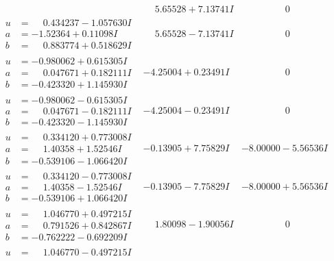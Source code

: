 \documentclass[1p]{elsarticle_modified}
\theoremstyle{definition}
\begin{document}
$$\begin{array}{c|c|c}
 & \phantom{-}5.65528 + 7.13741 I & \phantom{-0.000000 } 0 \\ \hline\begin{aligned}
u &= \phantom{-}0.434237 - 1.057630 I \\
a &= -1.52364 + 0.11098 I \\
b &= \phantom{-}0.883774 + 0.518629 I\end{aligned}
 & \phantom{-}5.65528 - 7.13741 I & \phantom{-0.000000 } 0 \\ \hline\begin{aligned}
u &= -0.980062 + 0.615305 I \\
a &= \phantom{-}0.047671 + 0.182111 I \\
b &= -0.423320 + 1.145930 I\end{aligned}
 & -4.25004 + 0.23491 I & \phantom{-0.000000 } 0 \\ \hline\begin{aligned}
u &= -0.980062 - 0.615305 I \\
a &= \phantom{-}0.047671 - 0.182111 I \\
b &= -0.423320 - 1.145930 I\end{aligned}
 & -4.25004 - 0.23491 I & \phantom{-0.000000 } 0 \\ \hline\begin{aligned}
u &= \phantom{-}0.334120 + 0.773008 I \\
a &= \phantom{-}1.40358 + 1.52546 I \\
b &= -0.539106 - 1.066420 I\end{aligned}
 & -0.13905 + 7.75829 I & -8.00000 - 5.56536 I \\ \hline\begin{aligned}
u &= \phantom{-}0.334120 - 0.773008 I \\
a &= \phantom{-}1.40358 - 1.52546 I \\
b &= -0.539106 + 1.066420 I\end{aligned}
 & -0.13905 - 7.75829 I & -8.00000 + 5.56536 I \\ \hline\begin{aligned}
u &= \phantom{-}1.046770 + 0.497215 I \\
a &= \phantom{-}0.791526 + 0.842867 I \\
b &= -0.762222 - 0.692209 I\end{aligned}
 & \phantom{-}1.80098 - 1.90056 I & \phantom{-0.000000 } 0 \\ \hline\begin{aligned}
u &= \phantom{-}1.046770 - 0.497215 I \\

\end{aligned}
\end{array}$$
\end{document}
